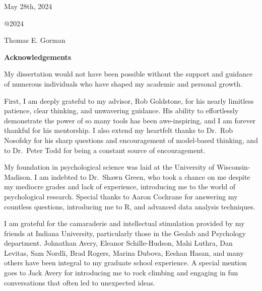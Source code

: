 \documentclass[
  11pt,
  letterpaper,
]{article}
\begin{document}
\hfill\break
May 28th, 2024

\newpage

\begin{centering}

\vspace*{6.5cm}

@2024 \\
\vspace{1cm} 

Thomas E. Gorman
\vspace{.2cm}

\vspace{5cm}

\end{centering}

\newpage

\begin{centering}

\textbf{Acknowledgements}

\end{centering}

My dissertation would not have been possible without the support and
guidance of numerous individuals who have shaped my academic and
personal growth.

First, I am deeply grateful to my advisor, Rob Goldstone, for his nearly
limitless patience, clear thinking, and unwavering guidance. His ability
to effortlessly demonstrate the power of so many tools has been
awe-inspiring, and I am forever thankful for his mentorship. I also
extend my heartfelt thanks to Dr.~Rob Nosofsky for his sharp questions
and encouragement of model-based thinking, and to Dr.~Peter Todd for
being a constant source of encouragement.

My foundation in psychological science was laid at the University of
Wisconsin-Madison. I am indebted to Dr.~Shawn Green, who took a chance
on me despite my mediocre grades and lack of experience, introducing me
to the world of psychological research. Special thanks to Aaron Cochrane
for answering my countless questions, introducing me to R, and advanced
data analysis techniques.

I am grateful for the camaraderie and intellectual stimulation provided
by my friends at Indiana University, particularly those in the Geolab
and Psychology department. Johnathan Avery, Eleanor Schille-Hudson, Mahi
Luthra, Dan Levitas, Sam Nordli, Brad Rogers, Marina Dubova, Eeshan
Hasan, and many others have been integral to my graduate school
experience. A special mention goes to Jack Avery for introducing me to
rock climbing and engaging in fun conversations that often led to
unexpected ideas.
\end{document}

